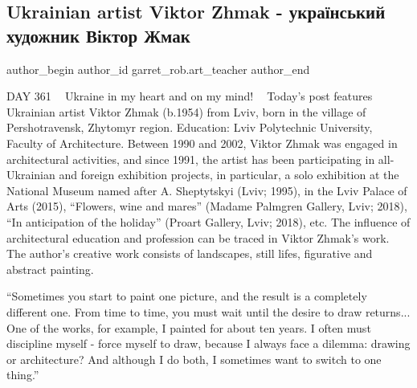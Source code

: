  
 
 
 
 

\subsection{Ukrainian artist Viktor Zhmak - український художник Віктор Жмак}
\label{sec:19_02_2023.fb.garret_rob.art_teacher.1.ukrainian_artist_vik}

\ifcmt
 author_begin
   author_id garret_rob.art_teacher
 author_end
\fi

DAY 361 💙💛 Ukraine in my heart and on my mind! 💙💛 Today's post features
Ukrainian artist Viktor Zhmak (b.1954) from Lviv, born in the village of
Pershotravensk, Zhytomyr region. Education: Lviv Polytechnic University,
Faculty of Architecture. Between 1990 and 2002, Viktor Zhmak was engaged in
architectural activities, and since 1991, the artist has been participating in
all-Ukrainian and foreign exhibition projects, in particular, a solo exhibition
at the National Museum named after A. Sheptytskyi (Lviv; 1995), in the Lviv
Palace of Arts (2015), \enquote{Flowers, wine and mares} (Madame Palmgren Gallery,
Lviv; 2018), \enquote{In anticipation of the holiday} (Proart Gallery, Lviv; 2018),
etc. The influence of architectural education and profession can be traced in
Viktor Zhmak's work. The author's creative work consists of landscapes, still
lifes, figurative and abstract painting.

\enquote{Sometimes you start to paint one picture, and the result is a completely
different one. From time to time, you must wait until the desire to draw
returns... One of the works, for example, I painted for about ten years. I
often must discipline myself - force myself to draw, because I always face a
dilemma: drawing or architecture? And although I do both, I sometimes want to
switch to one thing.}

